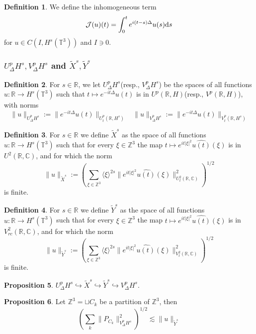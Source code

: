 \documentclass{article}
\theoremstyle{definition}
\newtheorem{definition}{Definition}[subsection]
\newtheorem{proposition}[definition]{Proposition}
\theoremstyle{remark}
\newcommand{\dif}{\mathrm{d}}
\begin{document}
\begin{definition}
We define the inhomogeneous term
$${\cal J}(u)(t)=\int_0^te^{i(t-s)\Delta}u(s)\dif s$$
for $u\in C(I,H^s(\mathbb{T}^3))$ and $I\ni0$. 
\end{definition}

\subsubsection{$U^p_\Delta H^s,V^p_\Delta H^s$ and $\widetilde{X}^s,\widetilde{Y}^s$}
\begin{definition}
For $s\in\mathbb{R}$, we let $U_\Delta^p H^s$(resp., $V_\Delta^p H^s$) be the spaces of all functions $u:\mathbb{R}\rightarrow H^s(\mathbb{T}^3)$ such that $t\mapsto e^{-it\Delta}u(t)$ is in $U^p(\mathbb{R},H)$(resp., $V^p(\mathbb{R},H)$), with norms 
$$\|u\|_{U^p_\Delta H^s}:=\|e^{-it\Delta}u(t)\|_{U^p_t(\mathbb{R},H^s)}\ \ \ \ \|u\|_{V^p_\Delta H^s}:=\|e^{-it\Delta}u(t)\|_{V^p_t(\mathbb{R},H^s)}$$
\end{definition}

\begin{definition}
For $s\in\mathbb{R}$ we define $\widetilde{X}^s$ as the space of all functions $u:\mathbb{R}\rightarrow H^s(\mathbb{T}^3)$ such that for every $\xi\in\mathbb{Z}^3$ the map $t\mapsto e^{it|\xi|^2}\widehat{u(t)}(\xi)$ is in $U^2(\mathbb{R},\mathbb{C})$, and for which the norm 
$$\|u\|_{\widetilde{X}^s}:=\left(\sum_{\xi\in\mathbb{Z}^3}\langle\xi\rangle^{2s}\|e^{it|\xi|^2}\widehat{u(t)}(\xi)\|^2_{U_t^2(\mathbb{R},\mathbb{C})}\right)^{1/2}$$
is finite. 
\end{definition}

\begin{definition}
For $s\in\mathbb{R}$ we define $\widetilde{Y}^s$ as the space of all functions $u:\mathbb{R}\rightarrow H^s(\mathbb{T}^3)$ such that for every $\xi\in\mathbb{Z}^3$ the map $t\mapsto e^{it|\xi|^2}\widehat{u(t)}(\xi)$ is in $V_{rc}^2(\mathbb{R},\mathbb{C})$, and for which the norm 
$$\|u\|_{\widetilde{Y}^s}:=\left(\sum_{\xi\in\mathbb{Z}^3}\langle\xi\rangle^{2s}\|e^{it|\xi|^2}\widehat{u(t)}(\xi)\|^2_{V_t^2(\mathbb{R},\mathbb{C})}\right)^{1/2}$$
is finite. 
\end{definition}

\begin{proposition}
$U^p_\Delta H^s\hookrightarrow \widetilde{X}^s\hookrightarrow \widetilde{Y}^s\hookrightarrow V^p_\Delta H^s$. 
\end{proposition}

\begin{proposition}
Let $\mathbb{Z}^3=\sqcup C_k$ be a partition of $\mathbb{Z}^3$, then
$$\left(\sum_k\|P_{C_k}\|_{V^p_\Delta H^s}^2\right)^{1/2}\lesssim\|u\|_{\widetilde{Y}^s}$$
\end{proposition}
\end{document}

